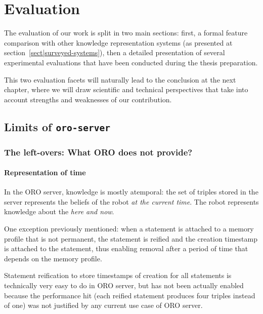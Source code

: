 \chapter{Evaluation}
\label{chapt|evaluation}

The evaluation of our work is split in two main sections: first, a formal
feature comparison with other knowledge representation systems (as presented at
section~\ref{sect|surveyed-systems}), then a detailed presentation of several
experimental evaluations that have been conducted during the thesis preparation.


This two evaluation facets will naturally lead to the conclusion at the next
chapter, where we will draw scientific and technical perspectives that take
into account strengths and weaknesses of our contribution.

\section{Limits of {\tt oro-server}}
\label{sect|limits-oroserver}

\subsection{The left-overs: What ORO does not provide?}

\subsubsection{Representation of time}

In the ORO server, knowledge is mostly atemporal: the set of triples stored in
the server represents the beliefs of the robot \emph{at the current time}. The
robot represents knowledge about the \emph{here and now}.

One exception previously mentioned: when a statement is attached to a memory
profile that is not permanent, the statement is reified and the creation
timestamp is attached to the statement, thus enabling removal after a period of
time that depends on the memory profile.

Statement reification to store timestamps of creation for all statements is
technically very easy to do in ORO server, but has not been actually enabled
because the performance hit (each reified statement produces four triples
instead of one) was not justified by any current use case of ORO server.

